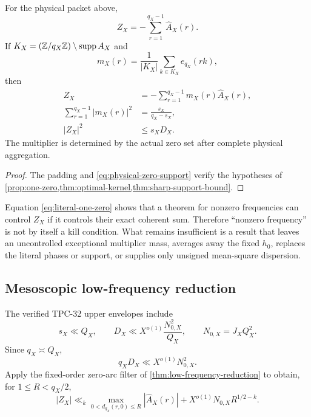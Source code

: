 \begin{theorem}
\label{thm:literal-interface}
For the physical packet above,
\begin{equation}
 \boxed{
 Z_X=-\sum_{r=1}^{q_X-1}\widehat A_X(r).}
\label{eq:literal-one-zero}
\end{equation}
If \(K_X=(\mathbb Z/q_X\mathbb Z)\setminus\operatorname{supp} A_X\) and
\[
 m_X(r)=\frac1{|K_X|}\sum_{k\in K_X}e_{q_X}(rk),
\]
then
\begin{align}
 Z_X&=-\sum_{r=1}^{q_X-1}m_X(r)\widehat A_X(r),
 \label{eq:literal-optimal-reassembly}\\
 \sum_{r=1}^{q_X-1}|m_X(r)|^2
 &=\frac{s_X}{q_X-s_X},
 \label{eq:literal-multiplier-mass}\\
 |Z_X|^2&\le s_XD_X.
 \label{eq:literal-support-bound}
\end{align}
The multiplier is determined by the actual zero set after complete
physical aggregation.
\end{theorem}

\begin{proof}
The padding and \eqref{eq:physical-zero-support} verify the hypotheses
of \cref{prop:one-zero,thm:optimal-kernel,thm:sharp-support-bound}.
\end{proof}

\begin{remark}
Equation \eqref{eq:literal-one-zero} shows that a theorem for nonzero
frequencies can control \(Z_X\) if it controls their exact coherent
sum.  Therefore ``nonzero frequency'' is not by itself a kill
condition.  What remains insufficient is a result that leaves an
uncontrolled exceptional multiplier mass, averages away the fixed
\(h_0\), replaces the literal phases or support, or supplies only
unsigned mean-square dispersion.
\end{remark}

\subsection{Mesoscopic low-frequency reduction}

The verified TPC-32 upper envelopes include
\[
 s_X\ll Q_X,\qquad
 D_X\ll X^{o(1)}\frac{N_{0,X}^2}{Q_X},
 \qquad N_{0,X}=J_XQ_X^2.
\]
Since \(q_X\asymp Q_X\),
\begin{equation}
 q_XD_X\ll X^{o(1)}N_{0,X}^2.
\label{eq:physical-fourier-energy}
\end{equation}
Apply the fixed-order zero-arc filter of
\cref{thm:low-frequency-reduction} to obtain, for
\(1\le R<q_X/2\),
\begin{equation}
 \boxed{
 |Z_X|
 \ll_k
 \max_{0<d_{q_X}(r,0)\le R}|\widehat A_X(r)|
 +X^{o(1)}N_{0,X}R^{1/2-k}.}
\label{eq:physical-low-frequency}
\end{equation}

